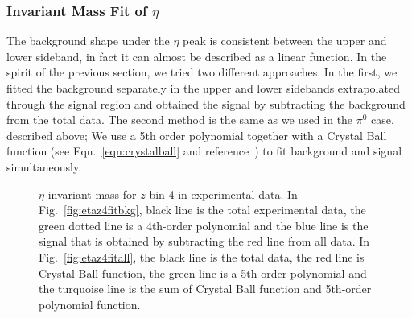 \subsubsection{\texorpdfstring{Invariant Mass Fit of $\eta$}{eta fit} }
\label{sec:etafitsection}
The background shape under the $\eta$ peak is consistent between the upper and lower sideband, in fact it can almost be described as a linear function. In the spirit of the previous section, we tried two different approaches. 
In the first, we fitted the background separately in the upper and lower sidebands 
extrapolated through the signal region and obtained the signal by subtracting the background from the total data. The second method is the same as we used in the $\pi^0$ case, described above; We use a 5th order polynomial together with a Crystal Ball function (see Eqn.~\ref{eqn:crystalball} and reference~\cite{CrystalBallFunc}) to fit background and signal simultaneously. 


\begin{figure}[h]
\centering     %
{}
\caption{$\eta$ invariant mass for $z$ bin 4 in experimental data. In Fig.~\ref{fig:etaz4fitbkg}, black line is the total experimental data, the green dotted line is a 4th-order polynomial and the blue line is the signal that is obtained by subtracting the red line from all data. In Fig.~\ref{fig:etaz4fitall}, the black line is the total data, the red line is Crystal Ball function, the green line is a 5th-order polynomial and the turquoise line is the sum of Crystal Ball function and 5th-order polynomial function.}
\label{fig:eta_fit}
\end{figure}

